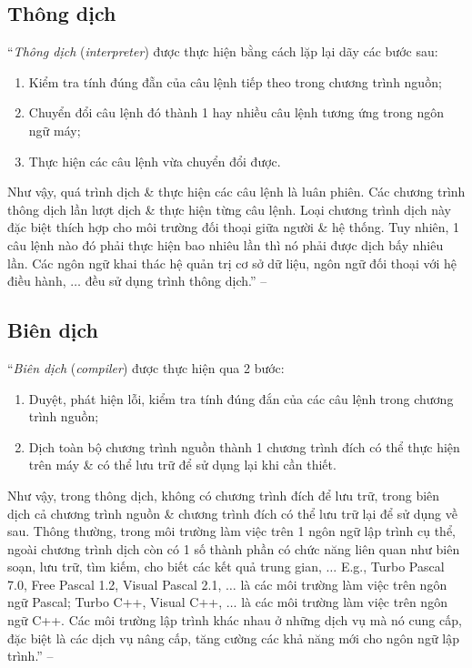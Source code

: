 \documentclass[oneside]{book}
\numberwithin{equation}{section}
\begin{document}
\subsection{Thông dịch}
``\textit{Thông dịch} (\textit{interpreter}) được thực hiện bằng cách lặp lại dãy các bước sau:
\begin{enumerate}
	\item Kiểm tra tính đúng đẵn của câu lệnh tiếp theo trong chương trình nguồn;
	\item Chuyển đổi câu lệnh đó thành 1 hay nhiều câu lệnh tương ứng trong ngôn ngữ máy;
	\item Thực hiện các câu lệnh vừa chuyển đổi được.
\end{enumerate}
Như vậy, quá trình dịch \& thực hiện các câu lệnh là luân phiên. Các chương trình thông dịch lần lượt dịch \& thực hiện từng câu lệnh. Loại chương trình dịch này đặc biệt thích hợp cho môi trường đối thoại giữa người \& hệ thống. Tuy nhiên, 1 câu lệnh nào đó phải thực hiện bao nhiêu lần thì nó phải được dịch bấy nhiêu lần. Các ngôn ngữ khai thác hệ quản trị cơ sở dữ liệu, ngôn ngữ đối thoại với hệ điều hành, $\ldots$ đều sử dụng trình thông dịch.'' -- \cite[p. 5]{SGK_Tin_Hoc_11}

\subsection{Biên dịch}
``\textit{Biên dịch} (\textit{compiler}) được thực hiện qua 2 bước:
\begin{enumerate}
	\item Duyệt, phát hiện lỗi, kiểm tra tính đúng đắn của các câu lệnh trong chương trình nguồn;
	\item Dịch toàn bộ chương trình nguồn thành 1 chương trình đích có thể thực hiện  trên máy \& có thể lưu trữ để sử dụng lại khi cần thiết.
\end{enumerate}
Như vậy, trong thông dịch, không có chương trình đích để lưu trữ, trong biên dịch cả chương trình nguồn \& chương trình đích có thể lưu trữ lại để sử dụng về sau. Thông thường, trong môi trường làm việc trên 1 ngôn ngữ lập trình cụ thể, ngoài chương trình dịch còn có 1 số thành phần có chức năng liên quan như biên soạn, lưu trữ, tìm kiếm, cho biết các kết quả trung gian, $\ldots$ E.g., Turbo Pascal 7.0, Free Pascal 1.2, Visual Pascal 2.1, $\ldots$ là các môi trường làm việc trên ngôn ngữ Pascal; Turbo C++, Visual C++, $\ldots$ là các môi trường làm việc trên ngôn ngữ C++. Các môi trường lập trình khác nhau ở những dịch vụ mà nó cung cấp, đặc biệt là các dịch vụ nâng cấp, tăng cường các khả năng mới cho ngôn ngữ lập trình.'' -- \cite[p. 5]{SGK_Tin_Hoc_11}
\end{document}
